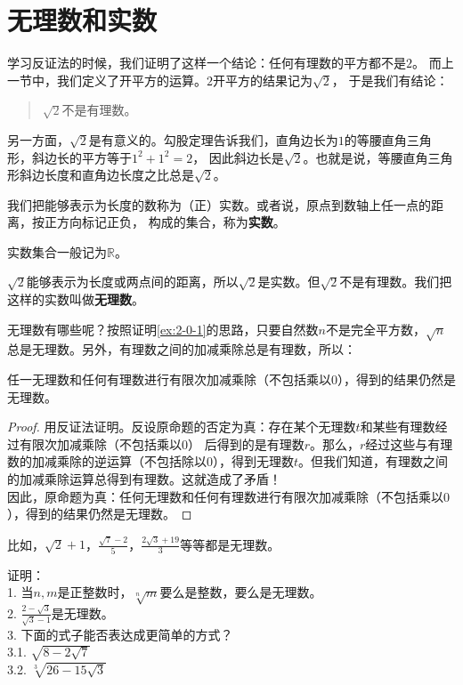 \documentclass[12pt,UTF8]{ctexbook}
\begin{document}
\section{无理数和实数}
学习反证法的时候，我们证明了这样一个结论：任何有理数的平方都不是$2$。
而上一节中，我们定义了开平方的运算。$2$开平方的结果记为$\sqrt{2}$，
于是我们有结论：
\begin{quotation}
    $\sqrt{2}$不是有理数。
\end{quotation}

另一方面，$\sqrt{2}$是有意义的。勾股定理告诉我们，直角边长为$1$的等腰直角三角形，斜边长的平方等于$1^2+1^2=2$，
因此斜边长是$\sqrt{2}$。也就是说，等腰直角三角形斜边长度和直角边长度之比总是$\sqrt{2}$。

我们把能够表示为长度的数称为（正）实数。或者说，原点到数轴上任一点的距离，按正方向标记正负，
构成的集合，称为\textbf{实数}。

实数集合一般记为$\mathbb{R}$。

$\sqrt{2}$能够表示为长度或两点间的距离，所以$\sqrt{2}$是实数。但$\sqrt{2}$不是有理数。我们把这样的实数叫做\textbf{无理数}。

无理数有哪些呢？按照证明\ref{ex:2-0-1}的思路，只要自然数$n$不是完全平方数，$\sqrt{n}$总是无理数。另外，有理数之间的加减乘除总是有理数，所以：
\begin{tm}\label{tm:3-1-0}
    任一无理数和任何有理数进行有限次加减乘除（不包括乘以$0$），得到的结果仍然是无理数。
\end{tm}
\begin{proof}
    用反证法证明。反设原命题的否定为真：存在某个无理数$t$和某些有理数经过有限次加减乘除（不包括乘以$0$）
    后得到的是有理数$r$。那么，$r$经过这些与有理数的加减乘除的逆运算（不包括除以$0$），得到无理数$t$。但我们知道，有理数之间的加减乘除运算总得到有理数。这就造成了矛盾！\\
    因此，原命题为真：任何无理数和任何有理数进行有限次加减乘除（不包括乘以$0$），得到的结果仍然是无理数。
\end{proof}

比如，$\sqrt{2}+1$，$\displaystyle\frac{\sqrt{7} - 2}{5}$，$\displaystyle\frac{2\sqrt{3} + 19}{3}$等等都是无理数。

\begin{xt}\label{xt:3-1-0}
    证明：\\
    1. 当$n,m$是正整数时，$\sqrt[n]{m}$要么是整数，要么是无理数。\\
    2. $\displaystyle\frac{2 - \sqrt{3}}{\sqrt{3} - 1}$是无理数。\\
    3. 下面的式子能否表达成更简单的方式？\\
    3.1. $\sqrt{8 - 2\sqrt{7}}$\\
    3.2. $\sqrt[3]{26 - 15\sqrt{3}}$
\end{xt}
\end{document}
